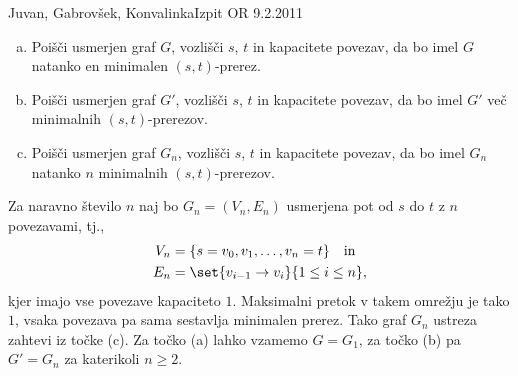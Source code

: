 \begin{naloga}{Juvan, Gabrovšek, Konvalinka}{Izpit OR 9.2.2011}
\begin{vprasanje}
\begin{enumerate}[(a)]
\item Poišči usmerjen graf $G$, vozlišči $s$, $t$ in kapacitete povezav,
da bo imel $G$ natanko en minimalen $(s, t)$-prerez.

\item Poišči usmerjen graf $G'$, vozlišči $s$, $t$ in kapacitete povezav,
da bo imel $G'$ več minimalnih $(s, t)$-prerezov.

\item Poišči usmerjen graf $G_n$, vozlišči $s$, $t$ in kapacitete povezav,
da bo imel $G_n$ natanko $n$ minimalnih $(s, t)$-prerezov.
\end{enumerate}
\end{vprasanje}

\begin{odgovor}
Za naravno število $n$ naj bo $G_n = (V_n, E_n)$
usmerjena pot od $s$ do $t$ z $n$ povezavami,
tj.,
\begin{align*}
V_n &= \{s = v_0, v_1, \dots, v_n = t\} \quad \text{in} \\
E_n &= \set{v_{i-1} \to v_i}{1 \le i \le n},
\end{align*}
kjer imajo vse povezave kapaciteto $1$.
Maksimalni pretok v takem omrežju je tako $1$,
vsaka povezava pa sama sestavlja minimalen prerez.
Tako graf $G_n$ ustreza zahtevi iz točke (c).
Za točko (a) lahko vzamemo $G = G_1$,
za točko (b) pa $G' = G_n$ za katerikoli $n \ge 2$.
\end{odgovor}
\end{naloga}
